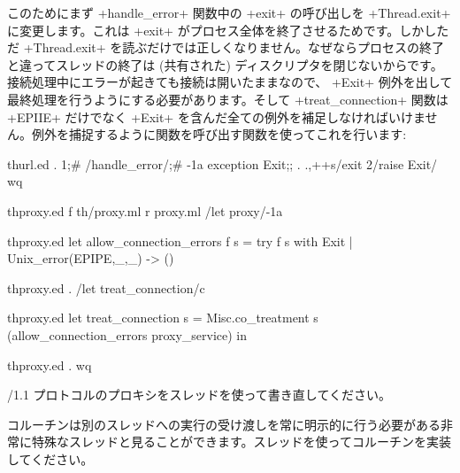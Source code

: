 このためにまず \ml+handle_error+ 関数中の \ml+exit+ の呼び出しを \ml+Thread.exit+ に変更します。これは \ml+exit+ がプロセス全体を終了させるためです。しかしただ \ml+Thread.exit+ を読ぶだけでは正しくなりません。なぜならプロセスの終了と違ってスレッドの終了は (共有された) ディスクリプタを閉じないからです。接続処理中にエラーが起きても接続は開いたままなので、 \ml+Exit+ 例外を出して最終処理を行うようにする必要があります。そして \ml+treat_connection+ 関数は \ml+EPIIE+ だけでなく \ml+Exit+ を含んだ全ての例外を補足しなければいけません。例外を捕捉するように関数を呼び出す関数を使ってこれを行います:%

\begin{codefile}{thurl.ed}
.
1;#
/handle_error/;#
-1a
exception Exit;;
.
.,++s/exit 2/raise Exit/
wq
\end{codefile}
%
\begin{codefile}{thproxy.ed}
f th/proxy.ml
r proxy.ml
/let proxy/-1a
\end{codefile}
\begin{listingcodefile}{thproxy.ed}
let allow_connection_errors f s =
  try f s with Exit | Unix_error(EPIPE,_,_) -> ()
\end{listingcodefile}
%
\begin{codefile}{thproxy.ed}
.
/let treat_connection/c
\end{codefile}
%
\begin{listingcodefile}{thproxy.ed}
let treat_connection s =
  Misc.co_treatment s (allow_connection_errors proxy_service) in
\end{listingcodefile}
%
\begin{codefile}{thproxy.ed}
.
wq
\end{codefile}

\begin{exercise}[noanswer]
\http/1.1 プロトコルのプロキシをスレッドを使って書き直してください。
\end{exercise}

\begin{exercise}[noanswer]
コルーチンは別のスレッドへの実行の受け渡しを常に明示的に行う必要がある非常に特殊なスレッドと見ることができます。スレッドを使ってコルーチンを実装してください。
\end{exercise}

